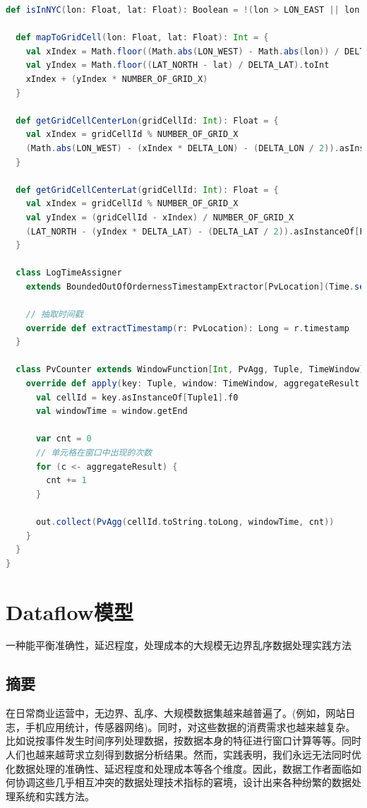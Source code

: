\documentclass[oneside]{ctexbook}
\begin{document}
\begin{lstlisting}[language=scala]
  def isInNYC(lon: Float, lat: Float): Boolean = !(lon > LON_EAST || lon < LON_WEST) && !(lat > LAT_NORTH || lat < LAT_SOUTH)

  def mapToGridCell(lon: Float, lat: Float): Int = {
    val xIndex = Math.floor((Math.abs(LON_WEST) - Math.abs(lon)) / DELTA_LON).toInt
    val yIndex = Math.floor((LAT_NORTH - lat) / DELTA_LAT).toInt
    xIndex + (yIndex * NUMBER_OF_GRID_X)
  }

  def getGridCellCenterLon(gridCellId: Int): Float = {
    val xIndex = gridCellId % NUMBER_OF_GRID_X
    (Math.abs(LON_WEST) - (xIndex * DELTA_LON) - (DELTA_LON / 2)).asInstanceOf[Float] * -1.0f
  }

  def getGridCellCenterLat(gridCellId: Int): Float = {
    val xIndex = gridCellId % NUMBER_OF_GRID_X
    val yIndex = (gridCellId - xIndex) / NUMBER_OF_GRID_X
    (LAT_NORTH - (yIndex * DELTA_LAT) - (DELTA_LAT / 2)).asInstanceOf[Float]
  }

  class LogTimeAssigner
    extends BoundedOutOfOrdernessTimestampExtractor[PvLocation](Time.seconds(10)) {

    // 抽取时间戳
    override def extractTimestamp(r: PvLocation): Long = r.timestamp
  }

  class PvCounter extends WindowFunction[Int, PvAgg, Tuple, TimeWindow] {
    override def apply(key: Tuple, window: TimeWindow, aggregateResult: Iterable[Int], out: Collector[PvAgg]) : Unit = {
      val cellId = key.asInstanceOf[Tuple1].f0
      val windowTime = window.getEnd

      var cnt = 0
      // 单元格在窗口中出现的次数
      for (c <- aggregateResult) {
        cnt += 1
      }

      out.collect(PvAgg(cellId.toString.toLong, windowTime, cnt))
    }
  }
}
\end{lstlisting}

\chapter{Dataflow模型}

一种能平衡准确性，延迟程度，处理成本的大规模无边界乱序数据处理实践方法

\section{摘要}

在日常商业运营中，无边界、乱序、大规模数据集越来越普遍了。(例如，网站日志，手机应用统计，传感器网络)。同时，对这些数据的消费需求也越来越复杂。比如说按事件发生时间序列处理数据，按数据本身的特征进行窗口计算等等。同时人们也越来越苛求立刻得到数据分析结果。然而，实践表明，我们永远无法同时优化数据处理的准确性、延迟程度和处理成本等各个维度。因此，数据工作者面临如何协调这些几乎相互冲突的数据处理技术指标的窘境，设计出来各种纷繁的数据处理系统和实践方法。
\end{document}
